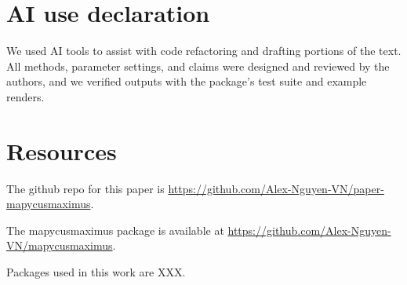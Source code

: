 \section{AI use declaration}\label{ai-use-declaration}

We used AI tools to assist with code refactoring and drafting portions of the text. All methods, parameter settings, and claims were designed and reviewed by the authors, and we verified outputs with the package's test suite and example renders.

\section{Resources}\label{resources}

The github repo for this paper is \url{https://github.com/Alex-Nguyen-VN/paper-mapycusmaximus}.

The mapycusmaximus package is available at \url{https://github.com/Alex-Nguyen-VN/mapycusmaximus}.

Packages used in this work are XXX.



\address{%
Thanh Cuong Nguyen\\
Monash University\\%
Department of Econometrics and Business Statistics\\ Melbourne, Australia\\
%
\url{https://alex-nguyen-vn.github.io}\\%
\textit{ORCiD: \href{https://orcid.org/0000-0000-0000-0000}{0000-0000-0000-0000}}\\%
\href{mailto:thanhcuong10091992@gmail.com}{\nolinkurl{thanhcuong10091992@gmail.com}}%
}

\address{%
Michael Lydeamore\\
Monash University\\%
Department of Econometrics and Business Statistics\\ Melbourne, Australia\\
%
\url{https://www.michaellydeamore.com}\\%
\textit{ORCiD: \href{https://orcid.org/0000-0001-6515-827X}{0000-0001-6515-827X}}\\%
\href{mailto:michael.lydeamore@monash.edu}{\nolinkurl{michael.lydeamore@monash.edu}}%
}

\address{%
Dianne Cook\\
Monash University\\%
Department of Econometrics and Business Statistics\\ Melbourne, Australia\\
%
\url{https://www.dicook.org}\\%
\textit{ORCiD: \href{https://orcid.org/0000-0002-3813-7155}{0000-0002-3813-7155}}\\%
\href{mailto:dicook@monash.edu}{\nolinkurl{dicook@monash.edu}}%
}
